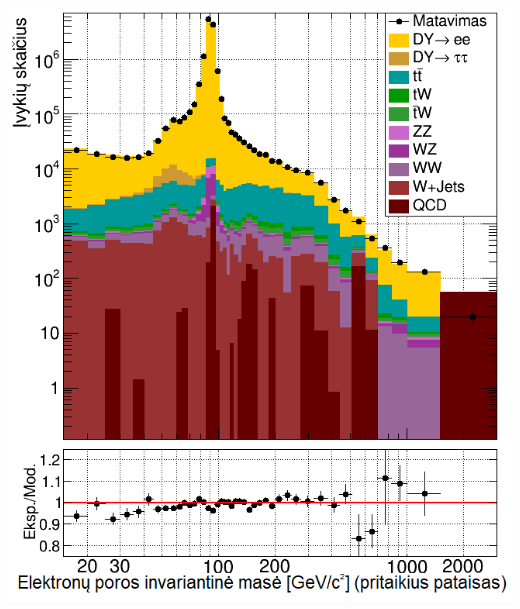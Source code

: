 \documentclass[xcolor=dvipsnames]{beamer}
\begin{document}
\begin{frame}
\begin{minipage}{0.49\textwidth}
		\includegraphics[width=0.9\linewidth]{eeMassAfter_SMALL.png}
	\end{minipage}
\end{frame}
\end{document}

